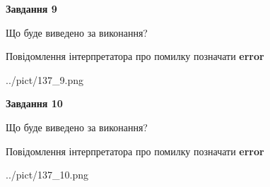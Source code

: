 \documentclass[12pt, ukrainian]{article}
\begin{document}
{{\begin {center}\textbf{Завдання 9}\end {center}}\par
Що буде виведено за виконання? \par
Повідомлення інтерпретатора про помилку позначати \textbf{error}

\begin{center}
	{../pict/137_9.png}
\end{center}
\newpage

{\begin {center}\textbf{Завдання 10}\end {center}}\par
Що буде виведено за виконання? \par
Повідомлення інтерпретатора про помилку позначати \textbf{error}

\begin{center}
	{../pict/137_10.png}
\end{center}
\newpage

}
\end{document}
